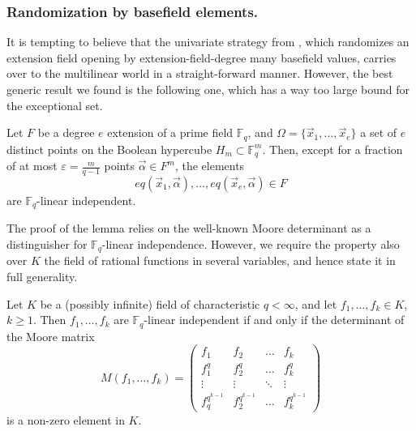 \subsubsection{Randomization by basefield elements.}

It is tempting to believe that the univariate strategy from \cite{cryptoeprint:2024/1037}, which randomizes an extension field opening by extension-field-degree many basefield values, carries over to the multilinear world in a straight-forward manner.
However, the best generic result we found is the following one, which has a way too large bound for the exceptional set.

\begin{lem}
\label{lem:Lagrange:random:eval}
Let $F$ be a degree $e$ extension of a prime field $\mathbb F_q$, and $\Omega =\{\vec x_1, \ldots, \vec x_e\}$ a set of $e$ distinct points on the Boolean hypercube $H_m\subset \mathbb F_q^m$. 
Then, except for a fraction of at most $\varepsilon = \frac{m}{q-1}$ points $\vec \alpha \in F^m$, the elements
\begin{equation*}
eq(\vec x_1, \vec \alpha), \ldots, eq(\vec x_e, \vec \alpha) \in F
\end{equation*}
are $\mathbb F_q$-linear independent. 
\end{lem}


The proof of the lemma relies on the well-known Moore determinant as a distinguisher for $\mathbb F_q$-linear independence.
However, we require the property also over $K$ the field of rational functions in several variables, and hence state it in full generality.
\begin{lem}
\label{lem:goss}
Let $K$ be a (possibly infinite) field of characteristic $q<\infty$, and let $f_1,\ldots,f_k\in K$, $k\geq 1$.
Then $f_1,\ldots, f_k$ are $\mathbb F_q$-linear independent if and only if the determinant of the Moore matrix
\[
M(f_1,\ldots, f_k) =
\begin{pmatrix}
f_1 & f_2 & \ldots & f_k
\\
f_1^q & f_2^q & \ldots & f_k^q
\\
\vdots &\vdots & \ddots & \vdots
\\
f_q^{q^{k-1}} & f_2^{q^{k-1}} & \ldots & f_k^{q^{k-1}}
\end{pmatrix}
\]
is a non-zero element in $K$. 
\end{lem}

